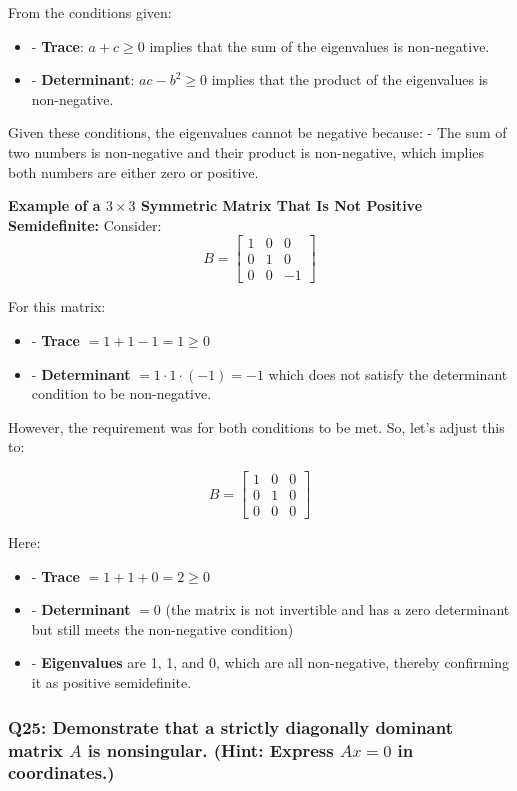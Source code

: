 \documentclass[8pt]{article}
\begin{document}
From the conditions given:
\begin{itemize}
    \item - \textbf{Trace}: \(a + c \geq 0\) implies that the sum of the eigenvalues is non-negative.
    \item - \textbf{Determinant}: \(ac - b^2 \geq 0\) implies that the product of the eigenvalues is non-negative.
\end{itemize}

Given these conditions, the eigenvalues cannot be negative because:
- The sum of two numbers is non-negative and their product is non-negative, which implies both numbers are either zero or positive.

\textbf{Example of a \(3 \times 3\) Symmetric Matrix That Is Not Positive Semidefinite:}
Consider:
\[
B = \begin{bmatrix}
1 & 0 & 0 \\
0 & 1 & 0 \\
0 & 0 & -1
\end{bmatrix}
\]

For this matrix:
\begin{itemize}
    \item - \textbf{Trace} \( = 1 + 1 - 1 = 1 \geq 0\)
    \item - \textbf{Determinant} \( = 1 \cdot 1 \cdot (-1) = -1 \) which does not satisfy the determinant condition to be non-negative.
\end{itemize}

However, the requirement was for both conditions to be met. So, let's adjust this to:

\[
B = \begin{bmatrix}
1 & 0 & 0 \\
0 & 1 & 0 \\
0 & 0 & 0
\end{bmatrix}
\]

Here:
\begin{itemize}
    \item - \textbf{Trace} \( = 1 + 1 + 0 = 2 \geq 0\)
    \item - \textbf{Determinant} \( = 0 \) (the matrix is not invertible and has a zero determinant but still meets the non-negative condition)
    \item - \textbf{Eigenvalues} are 1, 1, and 0, which are all non-negative, thereby confirming it as positive semidefinite.
\end{itemize}

\subsubsection*{Q25: Demonstrate that a strictly diagonally dominant matrix \(A\) is nonsingular. (Hint: Express \(Ax = 0\) in coordinates.)}
\end{document}
